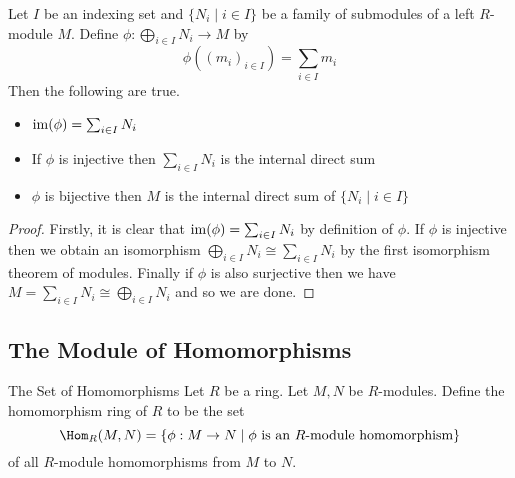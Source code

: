 \documentclass[a4paper]{article}
\begin{document}
\begin{lmm}{}{} Let $I$ be an indexing set and $\{N_i\;|\;i\in I\}$ be a family of submodules of a left $R$-module $M$. Define $\phi:\bigoplus_{i\in I}N_i\to M$ by $$\phi\left((m_i)_{i\in I}\right)=\sum_{i\in I}m_i$$ Then the following are true. 
\begin{itemize}
\item $\operatorname{im}(\phi)=\sum_{i\in I}N_i$
\item If $\phi$ is injective then $\sum_{i\in I}N_i$ is the internal direct sum
\item $\phi$ is bijective then $M$ is the internal direct sum of $\{N_i\;|\;i\in I\}$
\end{itemize} 
\begin{proof}
Firstly, it is clear that $\operatorname{im}(\phi)=\sum_{i\in I}N_i$ by definition of $\phi$. If $\phi$ is injective then we obtain an isomorphism $\bigoplus_{i\in I}N_i\cong\sum_{i\in I}N_i$ by the first isomorphism theorem of modules. Finally if $\phi$ is also surjective then we have $M=\sum_{i\in I}N_i\cong\bigoplus_{i\in I}N_i$ and so we are done. 
\end{proof}
\end{lmm}

\subsection{The Module of Homomorphisms}
\begin{defn}{The Set of Homomorphisms}{} Let $R$ be a ring. Let $M,N$ be $R$-modules. Define the homomorphism ring of $R$ to be the set $$\Hom_R(M,N)=\{\phi:M\to N\;|\;\phi\text{ is an }R\text{-module homomorphism}\}$$ of all $R$-module homomorphisms from $M$ to $N$.
\end{defn}
\end{document}
